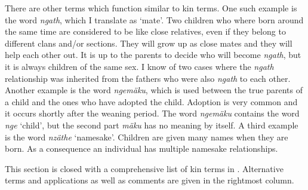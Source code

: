 There are other terms which function similar to kin terms. One such example is the word \emph{ngath}, which I translate as `mate'. Two children who where born around the same time are considered to be like close relatives, even if they belong to different clans and/or sections. They will grow up as close mates and they will help each other out. It is up to the parents to decide who will become \emph{ngath}, but it is always children of the same sex. I know of two cases where the \emph{ngath} relationship was inherited from the fathers who were also \emph{ngath} to each other. Another example is the word \emph{ngemäku}, which is used between the true parents of a child and the ones who have adopted the child. Adoption is very common and it occurs shortly after the weaning period. The word \emph{ngemäku} contains the word \emph{nge} `child', but the second part \emph{mäku} has no meaning by itself. A third example is the word \emph{nzäthe} `namesake'. Children are given many names when they are born. As a consequence an individual has multiple namesake relationships.

This section is closed with a comprehensive list of kin terms in . Alternative terms and applications as well as comments are given in the rightmost column.

